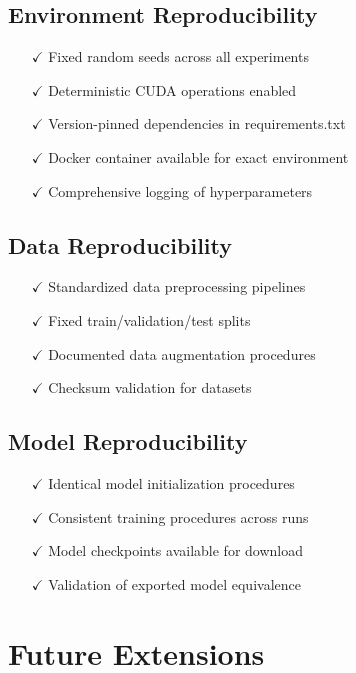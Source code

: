 \documentclass[journal]{IEEEtran}
\begin{document}
\subsection{Environment Reproducibility}
\begin{itemize}
    \item[$\checkmark$] Fixed random seeds across all experiments
    \item[$\checkmark$] Deterministic CUDA operations enabled
    \item[$\checkmark$] Version-pinned dependencies in requirements.txt
    \item[$\checkmark$] Docker container available for exact environment
    \item[$\checkmark$] Comprehensive logging of hyperparameters
\end{itemize}

\subsection{Data Reproducibility}
\begin{itemize}
    \item[$\checkmark$] Standardized data preprocessing pipelines
    \item[$\checkmark$] Fixed train/validation/test splits
    \item[$\checkmark$] Documented data augmentation procedures
    \item[$\checkmark$] Checksum validation for datasets
\end{itemize}

\subsection{Model Reproducibility}
\begin{itemize}
    \item[$\checkmark$] Identical model initialization procedures
    \item[$\checkmark$] Consistent training procedures across runs
    \item[$\checkmark$] Model checkpoints available for download
    \item[$\checkmark$] Validation of exported model equivalence
\end{itemize}

\section{Future Extensions}
\end{document}
